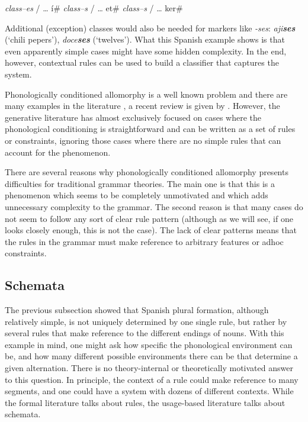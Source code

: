 \begin{exe}
    \ex \begin{xlist}
        \ex \textit{class--es} / \dots{} í\#
        \ex \textit{class--s} / \dots{} et\#
        \ex \textit{class--s} / \dots{} ker\#
    \end{xlist}
\end{exe}

Additional (exception) classes would also be needed for markers like \textit{-ses}: \textit{aji\textbf{ses}} (`chili pepers'), \textit{doce\textbf{ses}} (`twelves'). What this Spanish example shows is that even apparently simple cases might have some hidden complexity. In the end, however, contextual rules can be used to build a classifier that captures the system.

Phonologically conditioned allomorphy is a well known problem and there are many examples in the literature \autocites{Alber.2009, Anderson.2008, Baptista.2006, Booij.1998, Carstairs.1998, Malkiel.1988, Rubach.2001}, a recent review is given by \textcite{Nevins.2011a}. However, the generative literature has almost exclusively focused on cases where the phonological conditioning is straightforward and can be written as a set of rules or constraints, ignoring those cases where there are no simple rules that can account for the phenomenon.

There are several reasons why phonologically conditioned allomorphy presents difficulties for traditional grammar theories. The main one is that this is a phenomenon which seems to be completely unmotivated and which adds unnecessary complexity to the grammar. The second reason is that many cases do not seem to follow any sort of clear rule pattern (although as we will see, if one looks closely enough, this is not the case). The lack of clear patterns means that the rules in the grammar must make reference to arbitrary features or adhoc constraints.



\subsection{Schemata}


The previous subsection showed that Spanish plural formation, although relatively simple, is not uniquely determined by one single rule, but rather by several rules that make reference to the different endings of nouns. With this example in mind, one might ask how specific the phonological environment can be, and how many different possible environments there can be that determine a given alternation. There is no theory-internal or theoretically motivated answer to this question. In principle, the context of a rule could make reference to many segments, and one could have a system with dozens of different contexts. While the formal literature talks about rules, the usage-based literature talks about schemata.

